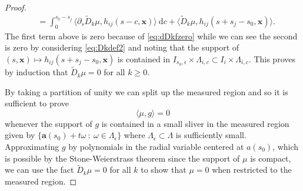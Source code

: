 \documentclass[10pt,a4paper]{amsart}
\newcommand{\dd}{\mathrm{d}}  %
\newcommand{\va}{\mathbf{a}}
\newcommand{\vx}{{\mathbf{x}}}
\begin{document}
\begin{proof}
\[\begin{split}
& = \int_{0}^{s_0-s_j} \langle \partial_s \widetilde{D}_k \mu, h_{ij}(s-c,\vx)\rangle \ \dd c + \langle \widetilde{D}_k \mu, h_{ij} (s+s_j-s_0,\vx) \rangle.
\end{split}
\]
The first term above is zero because of \eqref{eq:dDkfzero} while we can see the second is zero by considering \eqref{eq:Dkdef2} and noting that the support of $(s,\vx) \mapsto h_{ij}(s+s_j-s_0,\vx)$ is contained in $I_{s_0,\epsilon}\times \Lambda_{i,c} \subset I_i \times \Lambda_{i,c}$. This proves by induction that $\widetilde{D}_k \mu = 0$ for all $k \geq 0$.

By taking a partition of unity we can split up the measured region and so it is sufficient to prove
\[
\langle \mu, g \rangle = 0
\]
whenever the support of $g$ is contained in a small sliver in the measured region given by $\{ \va(s_0) + t \omega \ : \ \omega \in \Lambda_\epsilon\}$ where $\Lambda_\epsilon \subset \Lambda$ is sufficiently small. Approximating $g$ by polynomials in the radial variable centered at $a(s_0)$, which is possible by the Stone-Weierstrass theorem since the support of $\mu$ is compact, we can use the fact $\widetilde{D}_k 
\mu = 0$ for all $k$ to show that $\mu = 0$ when restricted to the measured region.
\end{proof}
\end{document}
